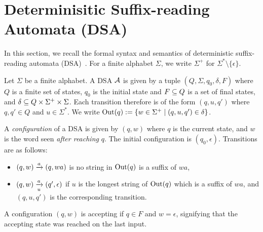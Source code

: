 \newcommand{\lt}{\ell}
\newcommand{\rt}{r}

\section{Determinisitic Suffix-reading Automata (DSA)}

In this section, we recall the formal syntax and semantics of deterministic suffix-reading automata (DSA)~\cite{DBLP:journals/corr/abs-2410-22761}. For a finite alphabet $\Sigma$, we write $\Sigma^+$ for $\Sigma^* \setminus \{\epsilon\}$. %

\begin{definition}
Let $\Sigma$ be a finite alphabet. A DSA $\mathcal{A}$ is given by a tuple $(Q, \Sigma, q_0, \delta, F)$ where $Q$ is a finite set of states, $q_0$ is the initial state and $F \subseteq Q$ is a set of final states, and $\delta \subseteq Q \times \Sigma^+ \times \Sigma$. Each transition therefore is of the form $(q, u, q')$ where $q, q' \in Q$ and $u \in \Sigma^*$. We write $\operatorname{Out}(q) := \{ w \in \Sigma^+ \mid (q, u, q') \in \delta \}$.
\end{definition}

A \emph{configuration} of a DSA is given by $(q, w)$ where $q$ is the current state, and $w$ is the word seen \emph{after reaching} $q$. The initial configuration is $(q_0, \epsilon)$. Transitions are as follows:
\begin{itemize}
\item $(q, w) \xrightarrow{a} (q, wa)$ is no string in $\operatorname{Out}(q)$ is a suffix of $wa$,
\item $(q, w) \xrightarrow[u]{a} (q', \epsilon)$ if $u$ is the longest string of $\operatorname{Out}(q)$ which is a suffix of $wa$, and $(q, u, q')$ is the corresponding transition. 
\end{itemize}
A configuration $(q, w)$ is accepting if $q \in F$ and $w = \epsilon$, signifying that the accepting state was reached on the last input.



